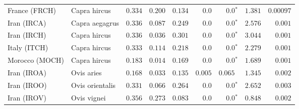 \begin{center}
\begin{adjustbox}{width = 1\textwidth}
\begin{tabular}{|l|l|r|r|r|r|r|r|r|}
                  France (FRCH) &         Capra hircus &                                        $ 0.334$ &                                           $ 0.200$ &                      $ 0.134$ &            $0.0$ &                  $\bm{0.0{^*}}$ &                                           $ 1.381$ &          $0.00097$ \\
                    Iran (IRCA) &       Capra aegagrus &                                        $ 0.336$ &                                           $ 0.087$ &                      $ 0.249$ &            $0.0$ &                  $\bm{0.0{^*}}$ &                                           $ 2.576$ &           $ 0.001$ \\
                    Iran (IRCH) &         Capra hircus &                                        $ 0.336$ &                                           $ 0.036$ &                      $ 0.301$ &            $0.0$ &                  $\bm{0.0{^*}}$ &                                           $ 3.044$ &           $ 0.001$ \\
                   Italy (ITCH) &         Capra hircus &                                        $ 0.333$ &                                           $ 0.114$ &                      $ 0.218$ &            $0.0$ &                  $\bm{0.0{^*}}$ &                                           $ 2.279$ &           $ 0.001$ \\
                 Morocco (MOCH) &         Capra hircus &                                        $ 0.183$ &                                           $ 0.014$ &                      $ 0.169$ &            $0.0$ &                  $\bm{0.0{^*}}$ &                                           $ 1.689$ &           $ 0.001$ \\
                    Iran (IROA) &           Ovis aries &                                        $ 0.168$ &                                           $ 0.033$ &                      $ 0.135$ &         $ 0.005$ &                      $ 0.065~~$ &                                           $ 1.345$ &           $ 0.002$ \\
                    Iran (IROO) &      Ovis orientalis &                                        $ 0.331$ &                                           $ 0.066$ &                      $ 0.264$ &            $0.0$ &                  $\bm{0.0{^*}}$ &                                           $ 2.652$ &           $ 0.003$ \\
                    Iran (IROV) &          Ovis vignei &                                        $ 0.356$ &                                           $ 0.273$ &                      $ 0.083$ &            $0.0$ &                  $\bm{0.0{^*}}$ &                                           $ 0.848$ &           $ 0.002$ \\

\end{tabular}
\end{adjustbox}
\end{center}
